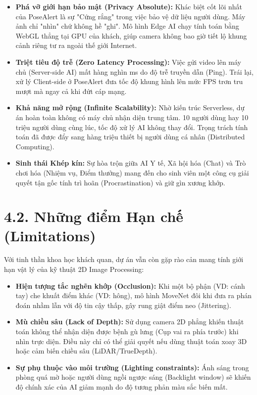 \documentclass[12pt,a4paper]{report}
\begin{document}
\begin{itemize}
    \item \textbf{Phá vỡ giới hạn bảo mật (Privacy Absolute):} Khác biệt cốt lõi nhất của PoseAlert là sự "Cứng rắng" trong việc bảo vệ dữ liệu người dùng. Máy ảnh chỉ "nhìn" chứ không hề "ghi". Mô hình Edge AI chạy tính toán bằng WebGL thẳng tại GPU của khách, giúp camera không bao giờ tiết lộ khung cảnh riêng tư ra ngoài thế giới Internet.
    \item \textbf{Triệt tiêu độ trễ (Zero Latency Processing):} Việc gửi video lên máy chủ (Server-side AI) mất hàng nghìn ms do độ trễ truyền dẫn (Ping). Trái lại, xử lý Client-side ở PoseAlert đưa tốc độ khung hình lên mức FPS trơn tru mượt mà ngay cả khi đứt cáp mạng.
    \item \textbf{Khả năng mở rộng (Infinite Scalability):} Nhờ kiến trúc Serverless, dự án hoàn toàn không có máy chủ nhận diện trung tâm. 10 người dùng hay 10 triệu người dùng cùng lúc, tốc độ xử lý AI không thay đổi. Trọng trách tính toán đã được đẩy sang hàng triệu thiết bị người dùng cá nhân (Distributed Computing).
    \item \textbf{Sinh thái Khép kín:} Sự hòa trộn giữa AI Y tế, Xã hội hóa (Chat) và Trò chơi hóa (Nhiệm vụ, Điểm thưởng) mang đến cho sinh viên một công cụ giải quyết tận gốc tính trì hoãn (Procrastination) và giữ gìn xương khớp.
\end{itemize}

\section{4.2. Những điểm Hạn chế (Limitations)}
Với tinh thần khoa học khách quan, dự án vẫn còn gặp rào cản mang tính giới hạn vật lý của kỹ thuật 2D Image Processing:
\begin{itemize}
    \item \textbf{Hiện tượng tắc nghẽn khớp (Occlusion):} Khi một bộ phận (VD: cánh tay) che khuất điểm khác (VD: hông), mô hình MoveNet đôi khi đưa ra phán đoán nhầm lẫn với độ tin cậy thấp, gây rung giật điểm neo (Jittering).
    \item \textbf{Mù chiều sâu (Lack of Depth):} Sử dụng camera 2D phẳng khiến thuật toán không thể nhận diện được bệnh gù lưng (Cụp vai ra phía trước) khi nhìn trực diện. Điều này chỉ có thể giải quyết nếu dùng thuật toán xoay 3D hoặc cảm biến chiều sâu (LiDAR/TrueDepth).
    \item \textbf{Sự phụ thuộc vào môi trường (Lighting constraints):} Ánh sáng trong phòng quá mờ hoặc người dùng ngồi ngược sáng (Backlight window) sẽ khiến độ chính xác của AI giảm mạnh do độ tương phản màu sắc biến mất.
\end{itemize}
\end{document}
